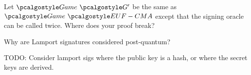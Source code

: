 \begin{exercise}
  Let $\Game~\algo{G'}$ be the same as $\Game~\algo{EUF-CMA}$ except that the signing oracle can be called twice. Where does your proof break?
\end{exercise}

\begin{exercise}[Optional]
  Why are Lamport signatures considered post-quantum?
\end{exercise}

\begin{exercise}
  TODO: Consider lamport sigs where the public key is a hash, or where the secret keys are derived.
\end{exercise}

